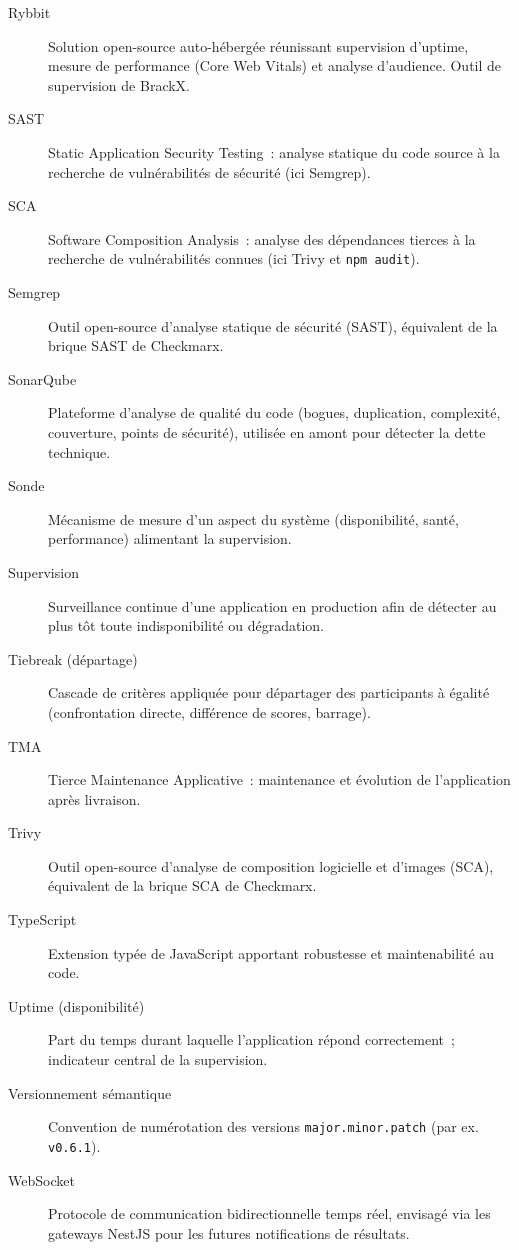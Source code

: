 \begin{description}
    \item[Rybbit] Solution open-source auto-hébergée réunissant supervision d'uptime, mesure de performance (Core Web Vitals) et analyse d'audience. Outil de supervision de BrackX.

    \item[SAST] Static Application Security Testing~: analyse statique du code source à la recherche de vulnérabilités de sécurité (ici Semgrep).

    \item[SCA] Software Composition Analysis~: analyse des dépendances tierces à la recherche de vulnérabilités connues (ici Trivy et \texttt{npm audit}).

    \item[Semgrep] Outil open-source d'analyse statique de sécurité (SAST), équivalent de la brique SAST de Checkmarx.

    \item[SonarQube] Plateforme d'analyse de qualité du code (bogues, duplication, complexité, couverture, points de sécurité), utilisée en amont pour détecter la dette technique.

    \item[Sonde] Mécanisme de mesure d'un aspect du système (disponibilité, santé, performance) alimentant la supervision.

    \item[Supervision] Surveillance continue d'une application en production afin de détecter au plus tôt toute indisponibilité ou dégradation.

    \item[Tiebreak (départage)] Cascade de critères appliquée pour départager des participants à égalité (confrontation directe, différence de scores, barrage).

    \item[TMA] Tierce Maintenance Applicative~: maintenance et évolution de l'application après livraison.

    \item[Trivy] Outil open-source d'analyse de composition logicielle et d'images (SCA), équivalent de la brique SCA de Checkmarx.

    \item[TypeScript] Extension typée de JavaScript apportant robustesse et maintenabilité au code.

    \item[Uptime (disponibilité)] Part du temps durant laquelle l'application répond correctement~; indicateur central de la supervision.

    \item[Versionnement sémantique] Convention de numérotation des versions \texttt{major.minor.patch} (par ex. \texttt{v0.6.1}).

    \item[WebSocket] Protocole de communication bidirectionnelle temps réel, envisagé via les gateways NestJS pour les futures notifications de résultats.
\end{description}
